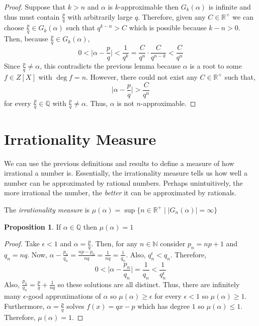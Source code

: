 \documentclass{article}
\newcommand{\N}{\mathbb{N}}
\newcommand{\Q}{\mathbb{Q}}
\newcommand{\Rplus}{\mathbb{R}^+}
\newenvironment{definition}[1][Definition:]{\begin{trivlist}
\item[\hskip \labelsep {\bfseries #1}]}{\end{trivlist}}
\theoremstyle{theorem}
\theoremstyle{definition}
\theoremstyle{definition}
\newtheorem*{proposition}{Proposition}
\theoremstyle{remark}
\theoremstyle{definition}
\theoremstyle{remark}
\begin{document}
\begin{proof}
Suppose that $k > n$ and $\alpha$ is $k$-approximable then $G_k(\alpha)$ is infinite and thus must contain $\frac{p}{q}$ with arbitrarily large $q$. Therefore, given any $C \in \Rplus$ we can choose $\frac{p}{q} \in G_k(\alpha)$ such that $q^{k-n} > C$ which is possible because $k - n > 0$. Then, because $\frac{p}{q} \in G_k(\alpha)$,
\[ 0 < \Big| \alpha - \frac{p}{q} \Big| < \frac{1}{q^k} = \frac{C}{q^n} \cdot \frac{C}{q^{n-k}} < \frac{C}{q^n}\]
Since $\frac{p}{q} \neq \alpha$, this contradicts the previous lemma because $\alpha$ is a root to some $f \in Z[X]$ with $\deg{f} = n$. However, there could not exist any $C \in \Rplus$ such that, 
\[ \Big| \alpha - \frac{p}{q} \Big| > \frac{C}{q^n}\]
for every $\frac{p}{q} \in \Q$ with $\frac{p}{q} \neq \alpha$. Thus, $\alpha$ is not $n$-approximable. 
\end{proof}

\section{Irrationality Measure} 

We can use the previous definitions and results to define a measure of how irrational a number is. Essentially, the irrationality measure tells us how well a number can be approximated by rational numbers. Perhaps unintuitively, the more irrational the number, the \textit{better} it can be approximated by rationals.

\begin{definition}
The \textit{irrationality measure} is $\mu(\alpha) = \sup\{n \in \Rplus \mid |G_n(\alpha)| = \infty\}$   
\end{definition}


\begin{proposition}
If $\alpha \in \Q$ then $\mu(\alpha) = 1$
\end{proposition}

\begin{proof}
Take $\epsilon < 1$ and $\alpha = \frac{p}{q}$. Then, for any $n \in \N$ consider $p_n = np + 1$ and $q_n = nq$. Now, $\alpha - \frac{p_n}{q_n} = \frac{np - p_n}{nq} = \frac{1}{nq} = \frac{1}{q_n}$. Also, $q_n^\epsilon < q_n$. Therefore,
\[  0 < \Big| \alpha - \frac{p_n}{q_n} \Big| = \frac{1}{q_n} < \frac{1}{q_n^\epsilon}\]
Also, $\frac{p_n}{q_n} = \frac{p}{q} + \frac{1}{nq}$ so these solutions are all distinct. Thus, there are infinitely many $\epsilon$-good approximations of $\alpha$ so $\mu(\alpha) \ge \epsilon$ for every $\epsilon < 1$ so $\mu(\alpha) \ge 1$. Furthermore, $\alpha = \frac{p}{q}$ solves $f(x) = qx - p$ which has degree $1$ so $\mu(\alpha) \le 1$. Therefore, $\mu(\alpha) = 1$. 
\end{proof}
\end{document}
